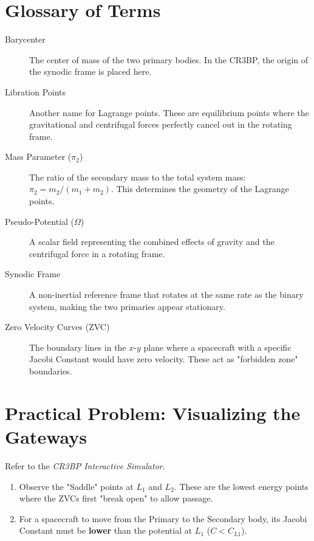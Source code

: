\documentclass[11pt, a4paper]{article}
\begin{document}
\section{Glossary of Terms}
\begin{description}
    \item[Barycenter] The center of mass of the two primary bodies. In the CR3BP, the origin of the synodic frame is placed here.
    \item[Libration Points] Another name for Lagrange points. These are equilibrium points where the gravitational and centrifugal forces perfectly cancel out in the rotating frame.
    \item[Mass Parameter ($\pi_2$)] The ratio of the secondary mass to the total system mass: $\pi_2 = m_2 / (m_1 + m_2)$. This determines the geometry of the Lagrange points.
    \item[Pseudo-Potential ($\Omega$)] A scalar field representing the combined effects of gravity and the centrifugal force in a rotating frame.
    \item[Synodic Frame] A non-inertial reference frame that rotates at the same rate as the binary system, making the two primaries appear stationary.
    \item[Zero Velocity Curves (ZVC)] The boundary lines in the $x$-$y$ plane where a spacecraft with a specific Jacobi Constant would have zero velocity. These act as "forbidden zone" boundaries.
\end{description}

\section{Practical Problem: Visualizing the Gateways}
Refer to the \textit{CR3BP Interactive Simulator}. 
\begin{enumerate}
    \item Observe the "Saddle" points at $L_1$ and $L_2$. These are the lowest energy points where the ZVCs first "break open" to allow passage.
    \item For a spacecraft to move from the Primary to the Secondary body, its Jacobi Constant must be \textbf{lower} than the potential at $L_1$ ($C < C_{L1}$). 
\end{enumerate}
\end{document}
